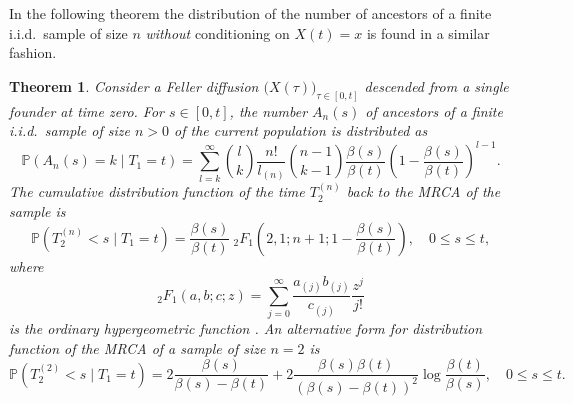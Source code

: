 \documentclass[preprint,12pt]{elsarticle}
\newtheorem{theorem}{Theorem}
\begin{document}
In the following theorem the distribution of the number of ancestors of a finite i.i.d.\ sample of size $n$ {\em without} conditioning on $X(t) = x$ 
is found in a similar fashion.  
\begin{theorem}
Consider a Feller diffusion $\big(X(\tau)\big)_{\tau \in [0, t]}$ descended from a single founder at time zero. 
For $s \in [0, t]$, the number $A_n(s)$ of ancestors of a finite i.i.d.\ sample of size $n > 0$ of the current population is distributed as 
\begin{equation}	\label{sampledAncestors}
\mathbb{P}(A_n(s) = k \mid T_1 = t) 
			= \sum_{l = k}^\infty  \binom{l}{k} \frac{n!}{l_{(n)}} \binom{n - 1}{k - 1}  \frac{\beta(s)}{\beta(t)} \left(1 - \frac{\beta(s)}{\beta(t)}\right)^{l - 1}. 
\end{equation}
The cumulative distribution function of the time $T_2^{(n)}$ back to the MRCA of the sample is 
\begin{equation*}	
\mathbb{P}(T_2^{(n)} < s\mid T_1 = t) = 
				\frac{\beta(s)}{\beta(t)}~_2F_1\left(2, 1; n + 1; 1 - \frac{\beta(s)}{\beta(t)}\right), \quad 0 \le s \le t, 
\end{equation*}	
where 
\[
_2F_1(a, b; c; z) = \sum_{j=0}^\infty\frac{a_{(j)}b_{(j)}}{c_{(j)}}\frac{z^j}{j!}
\]
is the ordinary hypergeometric function \citep[Eq.~(15.1.5)]{Abramowitz:1965sf}.  An alternative form for distribution function of the MRCA of 
a sample of size $n = 2$ is 
\begin{equation}	\label{MRCAnEquals2}	
\mathbb{P}(T_2^{(2)} < s\mid T_1 = t) = 
			2\frac{\beta(s)}{\beta(s) - \beta(t)} + 2\frac{\beta(s)\beta(t)}{(\beta(s) - \beta(t))^2} \log\frac{\beta(t)}{\beta(s)}, \quad 0 \le s \le t.  
\end{equation}	
\end{theorem}
%
\end{document}
